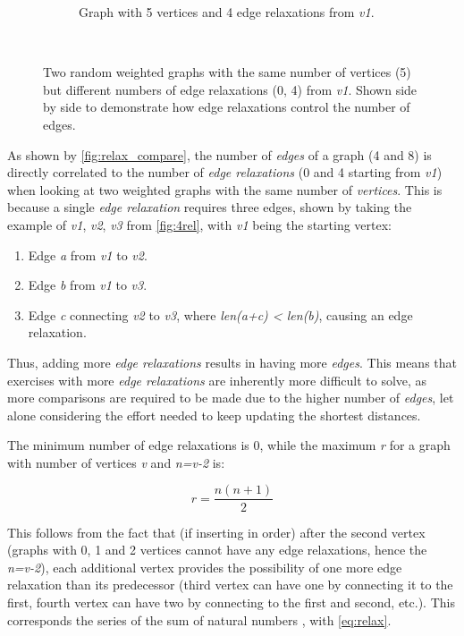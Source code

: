 \documentclass{l4proj}
\begin{document}
\begin{figure}
\begin{subfigure}[b]{0.49\textwidth}
        \caption{Graph with 5 vertices and 4 edge relaxations from \emph{v1}.}
        \label{fig:4rel}
    \end{subfigure}
    ~ %
    \caption{Two random weighted graphs with the same number of vertices (5) but different numbers of edge relaxations (0, 4) from \emph{v1}. Shown side by side to demonstrate how edge relaxations control the number of edges. }\label{fig:relax_compare}
\end{figure}

As shown by \autoref{fig:relax_compare}, the number of \emph{edges} of a graph (4 and 8) is directly correlated to the number of \emph{edge relaxations} (0 and 4 starting from \emph{v1}) when looking at two weighted graphs with the same number of \emph{vertices}. This is because a single \emph{edge relaxation} requires three edges, shown by taking the example of \emph{v1}, \emph{v2}, \emph{v3} from \autoref{fig:4rel}, with \emph{v1} being the starting vertex:
\begin{enumerate}
	\item
	Edge \emph{a} from \emph{v1} to \emph{v2}.
	\item
	Edge \emph{b} from \emph{v1} to \emph{v3}.
	\item
	Edge \emph{c} connecting \emph{v2} to \emph{v3}, where \emph{len(a+c) < len(b)}, causing an edge relaxation.
\end{enumerate}

Thus, adding more \emph{edge relaxations} results in having more \emph{edges}. This means that exercises with more \emph{edge relaxations} are inherently more difficult to solve, as more comparisons are required to be made due to the higher number of \emph{edges}, let alone considering the effort needed to keep updating the shortest distances. 

The minimum number of edge relaxations is 0, while the maximum \emph{r} for a graph with number of vertices \emph{v} and \emph{n=v-2} is:

\begin{equation}
	\label{eq:relax}
	r = \frac{n (n + 1)}{2}
\end{equation}

This follows from the fact that (if inserting in order) after the second vertex (graphs with 0, 1 and 2 vertices cannot have any edge relaxations, hence the \emph{n=v-2}), each additional vertex provides the possibility of one more edge relaxation than its predecessor (third vertex can have one by connecting it to the first, fourth vertex can have two by connecting to the first and second, etc.). This corresponds the series of the sum of natural numbers \cite{a}, with \autoref{eq:relax}.
\end{document}
